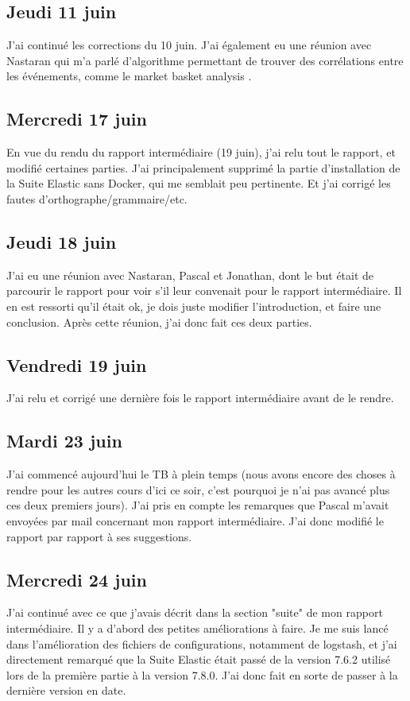 \documentclass[paper=a4, fontsize=11pt]{scrartcl}
\begin{document}
\subsection{Jeudi 11 juin}
    J'ai continué les corrections du 10 juin. J'ai également eu une réunion avec Nastaran qui m'a parlé d'algorithme permettant de trouver des corrélations entre les événements, comme le \og market basket analysis \fg.
\subsection{Mercredi 17 juin}
    En vue du rendu du rapport intermédiaire (19 juin), j'ai relu tout le rapport, et modifié certaines parties. J'ai principalement supprimé la partie d'installation de la Suite Elastic sans Docker, qui me semblait peu pertinente. Et j'ai corrigé les fautes d'orthographe/grammaire/etc.
\subsection{Jeudi 18 juin}
    J'ai eu une réunion avec Nastaran, Pascal et Jonathan, dont le but était de parcourir le rapport pour voir s'il leur convenait pour le rapport intermédiaire. Il en est ressorti qu'il était ok, je dois juste modifier l'introduction, et faire une conclusion. Après cette réunion, j'ai donc fait ces deux parties.
\subsection{Vendredi 19 juin}
    J'ai relu et corrigé une dernière fois le rapport intermédiaire avant de le rendre.
\subsection{Mardi 23 juin}
    J'ai commencé aujourd'hui le TB à plein temps (nous avons encore des choses à rendre pour les autres cours d'ici ce soir, c'est pourquoi je n'ai pas avancé plus ces deux premiers jours). J'ai pris en compte les remarques que Pascal m'avait envoyées par mail concernant mon rapport intermédiaire. J'ai donc modifié le rapport par rapport à ses suggestions.
\subsection{Mercredi 24 juin}
    J'ai continué avec ce que j'avais décrit dans la section "suite" de mon rapport intermédiaire. Il y a d'abord des petites améliorations à faire. Je me suis lancé dans l'amélioration des fichiers de configurations, notamment de logstash, et j'ai directement remarqué que la Suite Elastic était passé de la version 7.6.2 utilisé lors de la première partie à la version 7.8.0. J'ai donc fait en sorte de passer à la dernière version en date.
\end{document}

